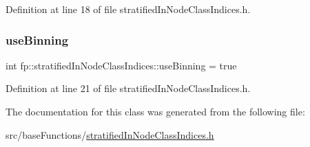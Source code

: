 Definition at line 18 of file stratified\+In\+Node\+Class\+Indices.\+h.

\mbox{\label{classfp_1_1stratifiedInNodeClassIndices_af6ca8b8a4539b8c35008cce88961fa00}} 
\subsubsection{\texorpdfstring{use\+Binning}{useBinning}}
{\footnotesize\ttfamily int fp\+::stratified\+In\+Node\+Class\+Indices\+::use\+Binning = true\hspace{0.3cm}{\ttfamily [private]}}



Definition at line 21 of file stratified\+In\+Node\+Class\+Indices.\+h.



The documentation for this class was generated from the following file\+:\begin{DoxyCompactItemize}
\item 
src/base\+Functions/\hyperlink{stratifiedInNodeClassIndices_8h}{stratified\+In\+Node\+Class\+Indices.\+h}\end{DoxyCompactItemize}
